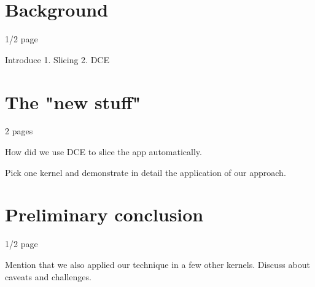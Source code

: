 \documentclass{acaces}
\begin{document}
\section{Background}

1/2 page

Introduce
1. Slicing
2. DCE

\section{The "new stuff"} 

2 pages

How did we use DCE to slice the app automatically.

Pick one kernel and demonstrate in detail the application of our approach.

\section{Preliminary conclusion}

1/2 page

Mention that we also applied our technique in a few other kernels.
Discuss about caveats and challenges.


\end{document}
